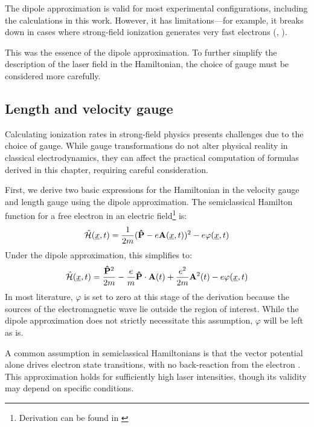 The dipole approximation is valid for most experimental configurations, including the calculations in this work. 
However, it has limitations—for example, it breaks down in cases where strong-field ionization generates very fast electrons (\cite{bosmandipoleapprox}, \cite{breakdowndipoleapprox}).

This was the essence of the dipole approximation.
To further simplify the description of the laser field in the Hamiltonian, the choice of gauge must be considered more carefully.






\subsection{Length and velocity gauge}
Calculating ionization rates in strong-field physics presents challenges due to the choice of gauge. While gauge transformations do not alter physical reality in classical electrodynamics, they can affect the practical computation of formulas derived in this chapter, requiring careful consideration.

First, we derive two basic expressions for the Hamiltonian in the velocity gauge and length gauge using the dipole approximation. 
The semiclassical Hamilton function for a free electron in an electric field\footnote{Derivation can be found in \cite{LandauLifschitzBand2}} is:%
\begin{equation}%
    \hat{\Hs}(\uvec{x}, t) = \frac{1}{2m}(\vec{\hat{P}} - e \vec{A}(\uvec{x}, t))^2 - e \varphi(\uvec{x}, t) \label{eq:semiClassicalHamilton}
\end{equation}
Under the dipole approximation, this simplifies to:
\begin{equation*}
    \hat{\mathcal{H}}(\underline{x}, t) = \frac{\mathbf{\hat{P}}^2}{2m} - \frac{e}{m}\mathbf{\hat{P}}\cdot \mathbf{A}(t) + \frac{e^2}{2m}\mathbf{A}^2(t) - e \varphi(\underline{x}, t)
\end{equation*}
In most literature, $\varphi$ is set to zero at this stage of the derivation because the sources of the electromagnetic wave lie outside the region of interest.
While the dipole approximation does not strictly necessitate this assumption, $\varphi$ will be left as is.

A common assumption in semiclassical Hamiltonians is that the vector potential alone drives electron state transitions, with no back-reaction from the electron \cite{bosmandipoleapprox}. 
This approximation holds for sufficiently high laser intensities, though its validity may depend on specific conditions.%

